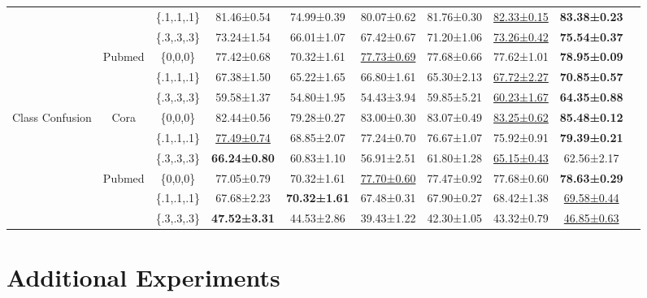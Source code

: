\documentclass[sigconf, anonymous, review]{acmart}
\begin{document}
\begin{table}
{\begin{tabular}{cccccccccc}
    &  &\{.1,.1,.1\}&81.46±0.54 &74.99±0.39&80.07±0.62 &81.76±0.30&\underline{82.33±0.15}&\textbf{83.38±0.23}  \\
    &  &\{.3,.3,.3\}&73.24±1.54 &66.01±1.07&67.42±0.67 &71.20±1.06&\underline{73.26±0.42}&\textbf{75.54±0.37}  \\
    & \multirow{3}{*}{Pubmed} &\{0,0,0\}&77.42±0.68 &70.32±1.61& \underline{77.73±0.69}&77.68±0.66&77.62±1.01&\textbf{78.95±0.09 } \\
    &  &\{.1,.1,.1\}& 67.38±1.50&65.22±1.65& 66.80±1.61&65.30±2.13&\underline{67.72±2.27}&\textbf{70.85±0.57}  \\
    &  &\{.3,.3,.3\}&59.58±1.37 &54.80±1.95& 54.43±3.94&59.85±5.21&\underline{60.23±1.67}&\textbf{64.35±0.88}  \\
    \midrule
    \multirow{6}{*}{Class Confusion} & \multirow{3}{*}{Cora} &\{0,0,0\}&82.44±0.56 &79.28±0.27&83.00±0.30 &83.07±0.49&\underline{83.25±0.62}&\textbf{85.48±0.12}  \\
    &  &\{.1,.1,.1\}&\underline{77.49±0.74} &68.85±2.07&77.24±0.70 &76.67±1.07&75.92±0.91&\textbf{79.39±0.21}  \\
    &  &\{.3,.3,.3\}&\textbf{66.24±0.80} &60.83±1.10&56.91±2.51 &61.80±1.28&\underline{65.15±0.43}&62.56±2.17  \\
    & \multirow{3}{*}{Pubmed} &\{0,0,0\}&77.05±0.79 &70.32±1.61&\underline{77.70±0.60} &77.47±0.92&77.68±0.60&\textbf{78.63±0.29}  \\
    &  &\{.1,.1,.1\}&67.68±2.23 &\textbf{70.32±1.61}& 67.48±0.31&67.90±0.27&68.42±1.38&\underline{69.58±0.44}  \\
    &  &\{.3,.3,.3\}&\textbf{47.52±3.31} &44.53±2.86&39.43±1.22 &42.30±1.05&43.32±0.79&\underline{46.85±0.63}  \\
    \bottomrule
  \end{tabular}}
  \label{tab:ablation_app}
\end{table}

\section{Additional Experiments}
\end{document}
